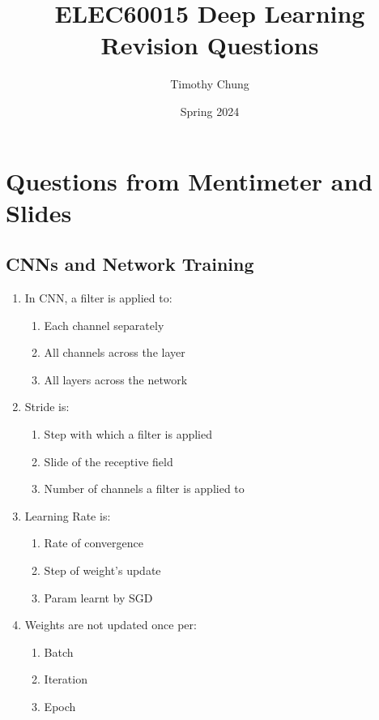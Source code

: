 \documentclass{report}
\title{ELEC60015 Deep Learning Revision Questions}
\author{Timothy Chung}
\date{Spring 2024}
\numberwithin{equation}{section}
\begin{document}
\maketitle



\tableofcontents %
\newpage 

\chapter{Questions from Mentimeter and Slides}
\renewcommand{\thesection}{2-3}
\section{CNNs and Network Training}


\begin{enumerate}
    \item In CNN, a filter is applied to:
    \begin{enumerate}[label=\alph*.]
        \item Each channel separately
        \item All channels across the layer
        \item All layers across the network
    \end{enumerate}
    \item Stride is:
    \begin{enumerate}[label=\alph*.]
        \item Step with which a filter is applied
        \item Slide of the receptive field
        \item Number of channels a filter is applied to
    \end{enumerate}
    \item Learning Rate is:
    \begin{enumerate}[label=\alph*.]
        \item Rate of convergence
        \item Step of weight's update
        \item Param learnt by SGD
    \end{enumerate}
    \item Weights are not updated once per:
    \begin{enumerate}[label=\alph*.]
        \item Batch
        \item Iteration
        \item Epoch
    \end{enumerate}

\end{enumerate}
\end{document}
